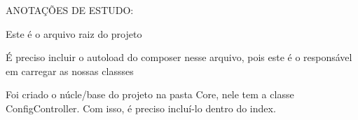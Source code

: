 ANOTAÇÕES DE ESTUDO:

Este é o arquivo raiz do projeto

É preciso incluir o autoload do composer nesse arquivo, pois este é o responsável em carregar as nossas classses

Foi criado o núcle/base do projeto na pasta Core, nele tem a classe ConfigController.
Com isso, é preciso incluí-lo dentro do index.